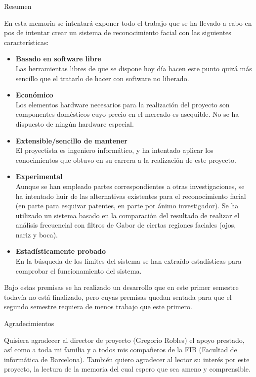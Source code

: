 \begin{center}
\Huge{Resumen}\\
\end{center}

En esta memoria se intentará exponer todo el trabajo que se ha llevado a cabo en pos de intentar crear un sistema de reconocimiento facial con las siguientes características:
\begin{itemize}
	\item{\textbf{Basado en software libre}\\
	Las herramientas libres de que se dispone hoy día hacen este punto quizá más sencillo que el tratarlo de hacer con software no liberado.}
	\item{\textbf{Económico}\\
	Los elementos hardware necesarios para la realización del proyecto son componentes domésticos cuyo precio en el mercado es asequible. No se ha dispuesto de ningún hardware especial. }
	\item{\textbf{Extensible/sencillo de mantener}\\
	El proyectista es ingeniero informático, y ha intentado aplicar los conocimientos que obtuvo en su carrera a la realización de este proyecto.}
	\item{\textbf{Experimental}\\
	Aunque se han empleado partes correspondientes a otras investigaciones, se ha intentado huir de las alternativas existentes para el reconocimiento facial (en parte para esquivar patentes, en parte por ánimo investigador). Se ha utilizado un sistema basado en la comparación del resultado de realizar el análisis frecuencial con filtros de Gabor de ciertas regiones faciales (ojos, nariz y boca).}
	\item{\textbf{Estadísticamente probado}\\
	En la búsqueda de los límites del sistema se han extraído estadísticas para comprobar el funcionamiento del sistema.}
\end{itemize}
Bajo estas premisas se ha realizado un desarrollo que en este primer semestre todavía no está finalizado, pero cuyas premisas quedan sentada para que el segundo semestre requiera de menos trabajo que este primero.\\[2cm]

\begin{center}
\Large{Agradecimientos}
\end{center}

Quisiera agradecer al director de proyecto (Gregorio Robles) el apoyo prestado, así como a toda mi familia y a todos mis compañeros de la FIB (Facultad de informática de Barcelona). También quiero agradecer al lector su interés por este proyecto, la lectura de la memoria del cual espero que sea ameno y comprensible. \\

